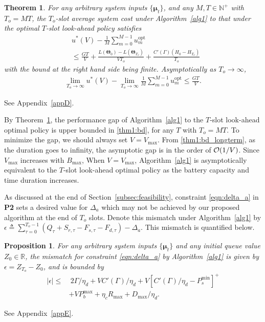 \documentclass[journal]{IEEEtran}
\def\mubf{\boldsymbol \mu }
\def\Thetabf{\boldsymbol \Theta}
\def\Oc{{\cal O}}
\def\nn{\nonumber}
\newtheorem{theorem}{Theorem}
\newtheorem{proposition}{Proposition}
\begin{document}
\begin{theorem} \label{thm1}
For any arbitrary system inputs $\{\mubf_t\}$, and any $M,T\in \mathbb{N}^+$ with $T_o=MT$, the  $T_o$-slot average system cost under  Algorithm~\ref{alg1}  to that under the optimal $T$-slot look-ahead policy satisfies
\begin{align}\label{thm1:bd}
&u^*(V)-\frac{1}{M}\sum_{m=0}^{M-1}u_m^\textrm{opt} \nn\\
&\leq
\frac{G T}{V}+\frac{L(\Thetabf_0)-L(\Thetabf_{T_o})}{VT_o}+\frac{C'(\Gamma)(H_0-H_{T_o})}{T_o}
\end{align}
with the bound at the right hand side being finite.
Asymptotically as $T_o\to \infty$, \\[-1.5em]
\begin{align}\label{thm1:bd_longterm}
\lim_{T_o\to \infty}u^*(V)-\lim_{T_o\to \infty}\frac{1}{M}\sum_{m=0}^{M-1}u_m^\textrm{opt}\le \frac{G T}{V}.
\end{align}
\end{theorem}
\IEEEproof
See Appendix~\ref{appD}.
\endIEEEproof


By Theorem~\ref{thm1}, the performance gap of Algorithm~\ref{alg1} to the $T$-slot look-ahead optimal policy is upper bounded in \eqref{thm1:bd}, for any $T$ with $T_o=MT$. To minimize the gap, we should always set $V = V_{\max}$. From \eqref{thm1:bd_longterm}, as the duration goes to infinity, the asymptotic gap is in the order of $\Oc(1/V)$. Since $V_{\max}$ increases with $B_{\max}$, When $V=V_{\max}$, Algorithm~\ref{alg1} is asymptotically equivalent to the $T$-slot look-ahead optimal policy as the battery capacity and time duration increases.



As discussed at the end of Section~\ref{subsec:feasibility}, constraint \eqref{eqn:delta_a} in {\bf P2} sets a desired value for  $\Delta_a$ which may not be achieved by our proposed algorithm at the end of $T_o$ slots. Denote this mismatch under Algorithm~\ref{alg1} by $\epsilon\triangleq \sum_{\tau=0}^{T_o-1}(Q_\tau+S_{r,\tau}-F_{s,\tau}-F_{d,\tau})- \Delta_a$. This mismatch is quantified below.
\begin{proposition}\label{prop3}
For any arbitrary system inputs $\{\mubf_t\}$ and  any initial queue value $Z_{0}\in \mathbb{R}$, the mismatch for constraint \eqref{eqn:delta_a} by Algorithm~\ref{alg1} is given by $\epsilon = Z_{T_o}-Z_{0}$, and is bounded by
\begin{align}
|\epsilon|\le & \  2\Gamma/\eta_d+VC'(\Gamma)/\eta_d+V[ C'(\Gamma)/\eta_d-P_{s}^{\min}]^+\nn \\
&+VP_{b}^{\max}+\eta_cR_{\max}+D_{\max}/\eta_d.
\end{align}
\end{proposition}
\IEEEproof
See Appendix~\ref{appE}.
\endIEEEproof
\end{document}

